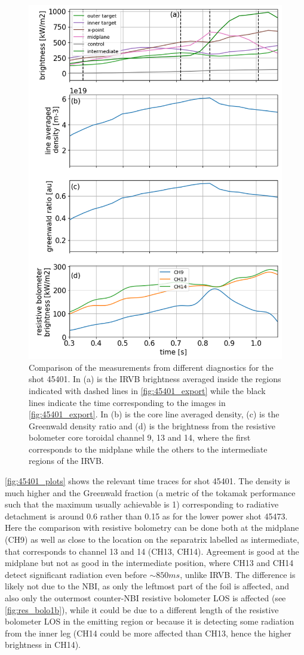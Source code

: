 \begin{figure}[!ht]
	\centering
	\includegraphics[width=0.7\linewidth,trim={15 0 0 0},clip]{Chapters/chapter2/figs/45401_for_paper.png}
	\caption{Comparison of the measurements from different diagnostics for the shot 45401. In (a) is the IRVB brightness averaged inside the regions indicated with dashed lines in \autoref{fig:45401_export} while the black lines indicate the time corresponding to the images in \autoref{fig:45401_export}. In (b) is the core line averaged density, (c) is the Greenwald density ratio and (d) is the brightness from the resistive bolometer core toroidal channel 9, 13 and 14, where the first corresponds to the midplane while the others to the intermediate regions of the IRVB.}
	\label{fig:45401_plots}
\end{figure}

\autoref{fig:45401_plots} shows the relevant time traces for shot 45401. The density is much higher and the Greenwald fraction (a metric of the tokamak performance such that the maximum usually achievable is 1\cite{Greenwald2002a}) corresponding to radiative detachment is around 0.6 rather than 0.15 as for the lower power shot 45473. Here the comparison with resistive bolometry can be done both at the midplane (CH9) as well as close to the location on the separatrix labelled as intermediate, that corresponds to channel 13 and 14 (CH13, CH14). Agreement is good at the midplane but not as good in the intermediate position, where CH13 and CH14 detect significant radiation even before $\sim850ms$, unlike IRVB. The difference is likely not due to the NBI, as only the leftmost part of the foil is affected, and also only the outermost counter-NBI resistive bolometer LOS is affected (see \autoref{fig:res_bolo1b}), while it could be due to a different length of the resistive bolometer LOS in the emitting region or because it is detecting some radiation from the inner leg (CH14 could be more affected than CH13, hence the higher brightness in CH14).



